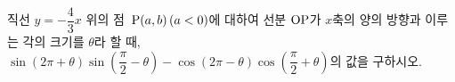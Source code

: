 직선 $y=-\dfrac{4}{3}x$ 위의 점~$\mathrm{P}(a{,}\mkern3mu\mathopen{}b)\mkern3mu (a<0)$에 대하여 선분 $\mathrm{OP}$가 $x$축의 양의 방향과 이루는 각의 크기를 $\theta$라 할 때, $\sin(2\pi+\theta)\sin\left(\dfrac{\pi}{2}-\theta\right)-\cos(2\pi-\theta)\cos\left(\dfrac{\pi}{2}+\theta\right)$의 값을 구하시오. 
